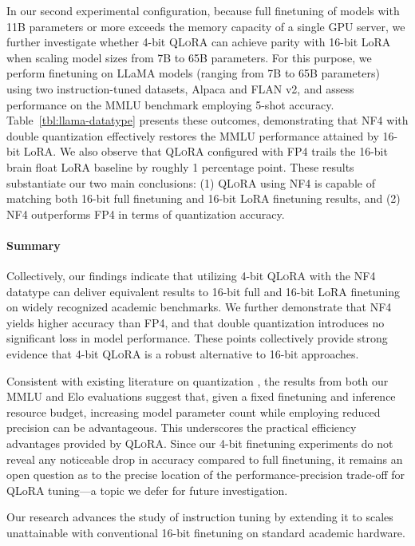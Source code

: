 In our second experimental configuration, because full finetuning of models with 11B parameters or more exceeds the memory capacity of a single GPU server, we further investigate whether 4-bit \textsc{QLoRA} can achieve parity with 16-bit LoRA when scaling model sizes from 7B to 65B parameters. For this purpose, we perform finetuning on LLaMA models (ranging from 7B to 65B parameters) using two instruction-tuned datasets, Alpaca and FLAN v2, and assess performance on the MMLU benchmark employing 5-shot accuracy. Table~\ref{tbl:llama-datatype} presents these outcomes, demonstrating that NF4 with double quantization effectively restores the MMLU performance attained by 16-bit LoRA. We also observe that \textsc{QLoRA} configured with FP4 trails the 16-bit brain float LoRA baseline by roughly 1 percentage point. These results substantiate our two main conclusions: (1) \textsc{QLoRA} using NF4 is capable of matching both 16-bit full finetuning and 16-bit LoRA finetuning results, and (2) NF4 outperforms FP4 in terms of quantization accuracy.

\paragraph{Summary} Collectively, our findings indicate that utilizing 4-bit \textsc{QLoRA} with the NF4 datatype can deliver equivalent results to 16-bit full and 16-bit LoRA finetuning on widely recognized academic benchmarks. We further demonstrate that NF4 yields higher accuracy than FP4, and that double quantization introduces no significant loss in model performance. These points collectively provide strong evidence that 4-bit \textsc{QLoRA} is a robust alternative to 16-bit approaches.

Consistent with existing literature on quantization \citep{dettmers2022case}, the results from both our MMLU and Elo evaluations suggest that, given a fixed finetuning and inference resource budget, increasing model parameter count while employing reduced precision can be advantageous. This underscores the practical efficiency advantages provided by \textsc{QLoRA}. Since our 4-bit finetuning experiments do not reveal any noticeable drop in accuracy compared to full finetuning, it remains an open question as to the precise location of the performance-precision trade-off for QLoRA tuning—a topic we defer for future investigation.

Our research advances the study of instruction tuning by extending it to scales unattainable with conventional 16-bit finetuning on standard academic hardware.

